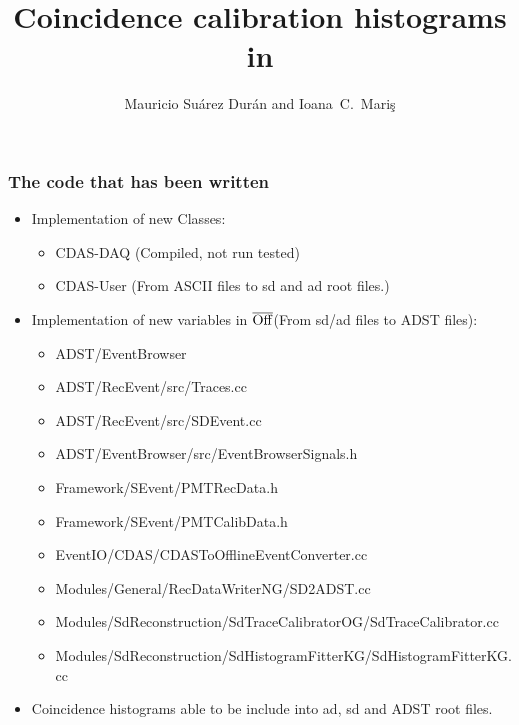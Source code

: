 \documentclass[aspectratio=169]{beamer}
\title{Coincidence calibration histograms in \Offline}
\author{
  Mauricio Su\'arez Dur\'an and Ioana~C.~Mari\c{s}
}
\institute{IIHE-ULB}
\def\Offline{\mbox{$\overline{\rm Off}$\hspace{.05em}\raisebox{.4ex}{$\underline{\rm line}$}}\xspace}
\begin{document}
\begin{frame}
  \titlepage
\end{frame}

\begin{frame}
  \frametitle{The code that has been written}
  \begin{itemize}
    \item Implementation of new Classes:
      \begin{itemize}
        \item<1-> CDAS-DAQ (Compiled, not run tested)
        \item<1-> CDAS-User (From ASCII files to sd and ad root          
          files.)
      \end{itemize}
      \vspace{0.2cm}

    \item<2->Implementation of new variables in \Offline (From
      sd/ad files to ADST files):
      \begin{itemize}
        \item<2-> ADST/EventBrowser
        \item<2-> ADST/RecEvent/src/Traces.cc
        \item<2-> ADST/RecEvent/src/SDEvent.cc
        \item<2-> ADST/EventBrowser/src/EventBrowserSignals.h
        \item<2-> Framework/SEvent/PMTRecData.h
        \item<2-> Framework/SEvent/PMTCalibData.h
        \item<2-> EventIO/CDAS/CDASToOfflineEventConverter.cc
        \item<2-> Modules/General/RecDataWriterNG/SD2ADST.cc
        \item<2-> Modules/SdReconstruction/SdTraceCalibratorOG/SdTraceCalibrator.cc
        \item<2-> Modules/SdReconstruction/SdHistogramFitterKG/SdHistogramFitterKG.cc
      \end{itemize}
      \vspace{0.2cm}

    \item<3->Coincidence histograms able to be include into ad,
      sd and ADST root files.
  \end{itemize}
\end{frame}
\end{document}
